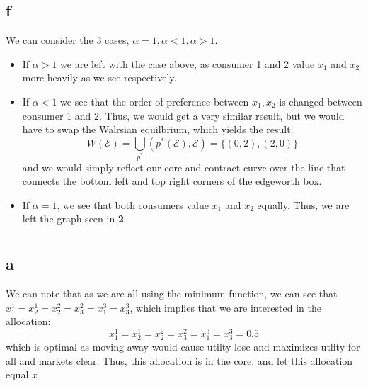 \documentclass[11pt]{article}
\begin{document}
\subsection*{f}
We can consider the 3 cases, $\alpha = 1, \alpha < 1, \alpha > 1$. 
\begin{itemize}
    \item If $\alpha > 1$ we are left with the case above, as consumer 1 and 2 value $x_1$ and $x_2$ more heavily as we see respectively. 
    \item If $\alpha < 1$ we see that the order of preference between $x_1, x_2$ is changed between consumer 1 and 2. Thus, we would get a very similar result, but we would have to swap the Walrsian equilbrium, which yields the result: 
    \[
        W(\mathcal{E}) = \bigcup_{p^*}(p^*(\mathcal{E}), \mathcal{E}) = \{(0, 2), (2, 0)\} 
    \]
    and we would simply reflect our core and contract curve over the line that connects the bottom left and top right corners of the edgeworth box. 
    \item If $\alpha = 1$, we see that both consumers value $x_1$ and $x_2$ equally. Thus, we are left the graph seen in \textbf{2}
\end{itemize}
\newpage
\section{}
\subsection*{a}
We can note that as we are all using the minimum function, we can see that $x_1^1 = x_2^1 = x_2^2 = x_3^2 = x_1^3 = x_3^3$, which implies that we are interested in the allocation:
\[
    x_1^1 = x_2^1 = x_2^2 = x_3^2 = x_1^3 = x_3^3 = 0.5
\]
which is optimal as moving away would cause utilty lose and maximizes utlity for all and markets clear. Thus, this allocation is in the core, and let this allocation equal $\overline{x}$
\end{document}
